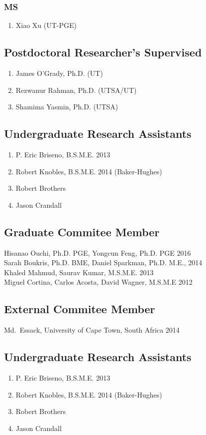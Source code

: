 \subsubsection*{MS}
\begin{enumerate}
    \item Xiao Xu (UT-PGE)
\end{enumerate}

\subsection*{Postdoctoral Researcher's Supervised}
  \begin{enumerate}
      \item James O'Grady, Ph.D. (UT)
      \item Rezwanur Rahman, Ph.D. (UTSA/UT)
      \item Shamima Yasmin, Ph.D. (UTSA)
  \end{enumerate}

\subsection*{Undergraduate Research Assistants}
  \begin{enumerate}
    \item P. Eric Briseno, B.S.M.E. 2013
    \item Robert Knobles, B.S.M.E. 2014 (Baker-Hughes)
    \item Robert Brothers
    \item Jason Crandall
  \end{enumerate}

\subsection*{Graduate Commitee Member}
Hisanao Ouchi, Ph.D. PGE, Yongcun Feng, Ph.D. PGE 2016 \\
Sarah Boukris, Ph.D. BME, Daniel Sparkman, Ph.D. M.E., 2014 \\
Khaled Mahmud, Saurav Kumar, M.S.M.E. 2013 \\
Miguel Cortina, Carlos Acosta, David Wagner, M.S.M.E 2012 

\subsection*{External Commitee Member}
Md.~Essack, University of Cape Town, South Africa 2014

\subsection*{Undergraduate Research Assistants}
  \begin{enumerate}
    \item P. Eric Briseno, B.S.M.E. 2013
    \item Robert Knobles, B.S.M.E. 2014 (Baker-Hughes)
    \item Robert Brothers
    \item Jason Crandall
  \end{enumerate}


